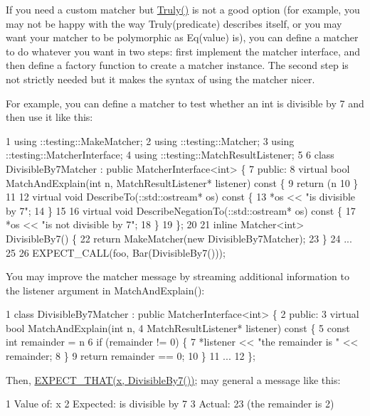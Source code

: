 If you need a custom matcher but {\ttfamily \hyperlink{namespacetesting_a5faf05cfaae6074439960048e478b1c8}{Truly()}} is not a good option (for example, you may not be happy with the way {\ttfamily Truly(predicate)} describes itself, or you may want your matcher to be polymorphic as {\ttfamily Eq(value)} is), you can define a matcher to do whatever you want in two steps\+: first implement the matcher interface, and then define a factory function to create a matcher instance. The second step is not strictly needed but it makes the syntax of using the matcher nicer.

For example, you can define a matcher to test whether an {\ttfamily int} is divisible by 7 and then use it like this\+: 
\begin{DoxyCode}
1 using ::testing::MakeMatcher;
2 using ::testing::Matcher;
3 using ::testing::MatcherInterface;
4 using ::testing::MatchResultListener;
5 
6 class DivisibleBy7Matcher : public MatcherInterface<int> \{
7  public:
8   virtual bool MatchAndExplain(int n, MatchResultListener* listener) const \{
9     return (n %
10   \}
11 
12   virtual void DescribeTo(::std::ostream* os) const \{
13     *os << "is divisible by 7";
14   \}
15 
16   virtual void DescribeNegationTo(::std::ostream* os) const \{
17     *os << "is not divisible by 7";
18   \}
19 \};
20 
21 inline Matcher<int> DivisibleBy7() \{
22   return MakeMatcher(new DivisibleBy7Matcher);
23 \}
24 ...
25 
26   EXPECT\_CALL(foo, Bar(DivisibleBy7()));
\end{DoxyCode}


You may improve the matcher message by streaming additional information to the {\ttfamily listener} argument in {\ttfamily Match\+And\+Explain()}\+:


\begin{DoxyCode}
1 class DivisibleBy7Matcher : public MatcherInterface<int> \{
2  public:
3   virtual bool MatchAndExplain(int n,
4                                MatchResultListener* listener) const \{
5     const int remainder = n %
6     if (remainder != 0) \{
7       *listener << "the remainder is " << remainder;
8     \}
9     return remainder == 0;
10   \}
11   ...
12 \};
\end{DoxyCode}


Then, {\ttfamily \hyperlink{gmock-matchers_8h_ac31e206123aa702e1152bb2735b31409}{E\+X\+P\+E\+C\+T\+\_\+\+T\+H\+A\+T(x, Divisible\+By7())};} may general a message like this\+: 
\begin{DoxyCode}
1 Value of: x
2 Expected: is divisible by 7
3   Actual: 23 (the remainder is 2)
\end{DoxyCode}


